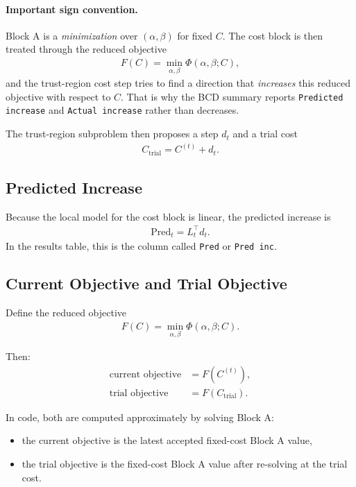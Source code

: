 \documentclass[11pt]{article}
\begin{document}
\paragraph{Important sign convention.}
Block A is a \emph{minimization} over $(\alpha,\beta)$ for fixed $C$. The cost
block is then treated through the reduced objective
\begin{align}
F(C) = \min_{\alpha,\beta} \Phi(\alpha,\beta;C),
\end{align}
and the trust-region cost step tries to find a direction that
\emph{increases} this reduced objective with respect to $C$. That is why the
BCD summary reports \texttt{Predicted increase} and \texttt{Actual increase}
rather than decreases.

The trust-region subproblem then proposes a step $d_t$ and a trial cost
\begin{align}
C_{\mathrm{trial}} = C^{(t)} + d_t.
\end{align}

\subsection{Predicted Increase}
Because the local model for the cost block is linear, the predicted increase is
\begin{align}
\mathrm{Pred}_t = L_t^\top d_t.
\end{align}
In the results table, this is the column called \texttt{Pred} or
\texttt{Pred inc}.

\subsection{Current Objective and Trial Objective}
Define the reduced objective
\begin{align}
F(C) = \min_{\alpha,\beta} \Phi(\alpha,\beta;C).
\end{align}

Then:
\begin{align*}
\text{current objective} &= F(C^{(t)}), \\
\text{trial objective} &= F(C_{\mathrm{trial}}).
\end{align*}

In code, both are computed approximately by solving Block A:
\begin{itemize}
\item the current objective is the latest accepted fixed-cost Block A value,
\item the trial objective is the fixed-cost Block A value after re-solving at
the trial cost.
\end{itemize}
\end{document}
